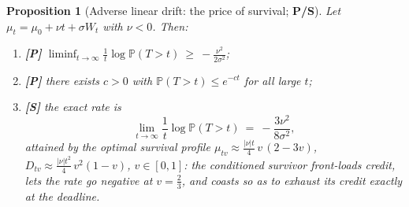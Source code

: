 \documentclass[11pt]{article}
\numberwithin{equation}{section}
\theoremstyle{plain}
\newtheorem{proposition}[theorem]{Proposition}
\theoremstyle{definition}
\theoremstyle{remark}
\newcommand{\PP}{\mathbb{P}}
\begin{document}
\begin{proposition}[Adverse linear drift: the price of survival;
\textbf{P/S}]\label{sh:prop:advdrift}
Let $\mu_t=\mu_0+\nu t+\sigma W_t$ with $\nu<0$. Then:
\begin{enumerate}[label=\emph{(\roman*)},itemsep=1pt]
\item \textbf{[P]}
$\displaystyle\liminf_{t\to\infty}\frac1t\log\PP(T>t)\ \ge\
-\frac{\nu^2}{2\sigma^2}$;
\item \textbf{[P]} there exists $c>0$ with $\PP(T>t)\le e^{-ct}$ for all
large $t$;
\item \textbf{[S]} the exact rate is
\begin{equation}\label{sh:eq:rate}
\lim_{t\to\infty}\frac1t\log\PP(T>t)\ =\ -\frac{3\nu^2}{8\sigma^2},
\end{equation}
attained by the optimal survival profile
$\mu_{tv}\approx\tfrac{|\nu|t}{4}\,v\,(2-3v)$,
$D_{tv}\approx\tfrac{|\nu|t^2}{4}\,v^2(1-v)$, $v\in[0,1]$: the conditioned
survivor front-loads credit, lets the rate go negative at $v=\tfrac23$, and
coasts so as to exhaust its credit exactly at the deadline.
\end{enumerate}
\end{proposition}
\end{document}
